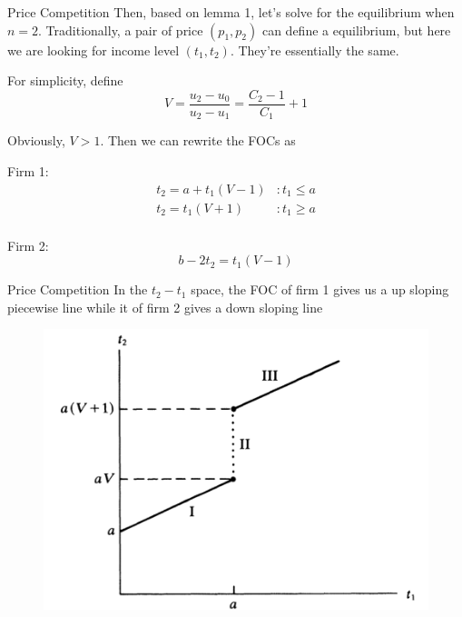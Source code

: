 \documentclass[10pt]{beamer}
\begin{document}
\begin{frame}{Price Competition}
Then, based on lemma 1, let's solve for the equilibrium when $n = 2$. Traditionally, a pair of price $(p_1, p_2)$ can define a equilibrium, but here we are looking for income level $(t_1,t_2)$. They're essentially the same.

For simplicity, define
\begin{equation}
    V = \frac{u_2 - u_0}{u_2 - u_1} = \frac{C_2 - 1}{C_1} + 1
\end{equation}

Obviously, $V > 1$. Then we can rewrite the FOCs as

Firm 1:
\begin{equation}
    \begin{split}
        t_2 = a + t_1 (V - 1) &: t_1 \leq a\\
        t_2 = t_1(V + 1) &: t_1 \geq a \\
    \end{split}
\end{equation}

Firm 2:
\begin{equation}
    b- 2t_2 = t_1(V - 1)
\end{equation}
\end{frame}

\begin{frame}{Price Competition}
In the $t_2-t_1$ space, the FOC of firm 1 gives us a up sloping piecewise line while it of firm 2 gives a down sloping line

\begin{figure}
    \centering
    \includegraphics[width = .7\textwidth]{sk3.png}
\end{figure}
    
\end{frame}
\end{document}
